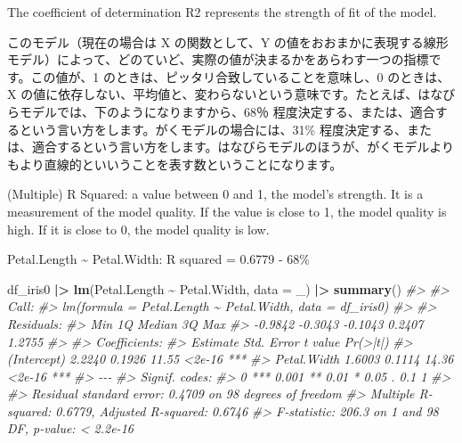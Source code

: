 \documentclass[
  xelatex, ja=standard]{bxjsbook}
\newenvironment{Shaded}{\begin{snugshade}}{\end{snugshade}}
\newcommand{\AttributeTok}[1]{\textcolor[rgb]{0.13,0.29,0.53}{#1}}
\newcommand{\CommentTok}[1]{\textcolor[rgb]{0.56,0.35,0.01}{\textit{#1}}}
\newcommand{\FunctionTok}[1]{\textcolor[rgb]{0.13,0.29,0.53}{\textbf{#1}}}
\newcommand{\NormalTok}[1]{#1}
\newcommand{\SpecialCharTok}[1]{\textcolor[rgb]{0.81,0.36,0.00}{\textbf{#1}}}
\theoremstyle{definition}
\theoremstyle{definition}
\theoremstyle{definition}
\theoremstyle{definition}
\theoremstyle{remark}
\begin{document}
The coefficient of determination R2 represents the strength of fit of the model.

このモデル（現在の場合は X の関数として、Y の値をおおまかに表現する線形モデル）によって、どのていど、実際の値が決まるかをあらわす一つの指標です。この値が、1 のときは、ピッタリ合致していることを意味し、0 のときは、X の値に依存しない、平均値と、変わらないという意味です。たとえば、はなびらモデルでは、下のようになりますから、68％ 程度決定する、または、適合するという言い方をします。がくモデルの場合には、31\% 程度決定する、または、適合するという言い方をします。はなびらモデルのほうが、がくモデルよりもより直線的といいうことを表す数ということになります。

(Multiple) R Squared: a value between 0 and 1, the model's strength. It is a measurement of the model quality. If the value is close to 1, the model quality is high. If it is close to 0, the model quality is low.

Petal.Length \textasciitilde{} Petal.Width: R squared = 0.6779 - 68\%

\begin{Shaded}
\begin{Highlighting}[]
\NormalTok{df\_iris0 }\SpecialCharTok{|\textgreater{}} \FunctionTok{lm}\NormalTok{(Petal.Length }\SpecialCharTok{\textasciitilde{}}\NormalTok{ Petal.Width, }\AttributeTok{data =}\NormalTok{ \_) }\SpecialCharTok{|\textgreater{}} \FunctionTok{summary}\NormalTok{()}
\CommentTok{\#\textgreater{} }
\CommentTok{\#\textgreater{} Call:}
\CommentTok{\#\textgreater{} lm(formula = Petal.Length \textasciitilde{} Petal.Width, data = df\_iris0)}
\CommentTok{\#\textgreater{} }
\CommentTok{\#\textgreater{} Residuals:}
\CommentTok{\#\textgreater{}     Min      1Q  Median      3Q     Max }
\CommentTok{\#\textgreater{} {-}0.9842 {-}0.3043 {-}0.1043  0.2407  1.2755 }
\CommentTok{\#\textgreater{} }
\CommentTok{\#\textgreater{} Coefficients:}
\CommentTok{\#\textgreater{}             Estimate Std. Error t value Pr(\textgreater{}|t|)    }
\CommentTok{\#\textgreater{} (Intercept)   2.2240     0.1926   11.55   \textless{}2e{-}16 ***}
\CommentTok{\#\textgreater{} Petal.Width   1.6003     0.1114   14.36   \textless{}2e{-}16 ***}
\CommentTok{\#\textgreater{} {-}{-}{-}}
\CommentTok{\#\textgreater{} Signif. codes:  }
\CommentTok{\#\textgreater{} 0 \textquotesingle{}***\textquotesingle{} 0.001 \textquotesingle{}**\textquotesingle{} 0.01 \textquotesingle{}*\textquotesingle{} 0.05 \textquotesingle{}.\textquotesingle{} 0.1 \textquotesingle{} \textquotesingle{} 1}
\CommentTok{\#\textgreater{} }
\CommentTok{\#\textgreater{} Residual standard error: 0.4709 on 98 degrees of freedom}
\CommentTok{\#\textgreater{} Multiple R{-}squared:  0.6779, Adjusted R{-}squared:  0.6746 }
\CommentTok{\#\textgreater{} F{-}statistic: 206.3 on 1 and 98 DF,  p{-}value: \textless{} 2.2e{-}16}
\end{Highlighting}
\end{Shaded}
\end{document}
